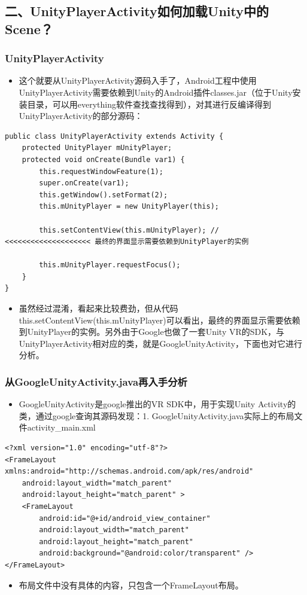 \documentclass[9pt, b5paper]{article}
\begin{document}
\subsection{二、UnityPlayerActivity如何加载Unity中的Scene？}
\label{sec-1-2}
\subsubsection{UnityPlayerActivity}
\label{sec-1-2-1}
\begin{itemize}
\item 这个就要从UnityPlayerActivity源码入手了，Android工程中使用UnityPlayerActivity需要依赖到Unity的Android插件classes.jar（位于Unity安装目录，可以用everything软件查找查找得到），对其进行反编译得到UnityPlayerActivity的部分源码：
\end{itemize}
\begin{verbatim}
public class UnityPlayerActivity extends Activity {
    protected UnityPlayer mUnityPlayer;
    protected void onCreate(Bundle var1) {
        this.requestWindowFeature(1);
        super.onCreate(var1);
        this.getWindow().setFormat(2);
        this.mUnityPlayer = new UnityPlayer(this);

        this.setContentView(this.mUnityPlayer); // <<<<<<<<<<<<<<<<<<<< 最终的界面显示需要依赖到UnityPlayer的实例

        this.mUnityPlayer.requestFocus();
    }
}
\end{verbatim}
\begin{itemize}
\item 虽然经过混淆，看起来比较费劲，但从代码this.setContentView(this.mUnityPlayer)可以看出，最终的界面显示需要依赖到UnityPlayer的实例。另外由于Google也做了一套Unity VR的SDK，与UnityPlayerActivity相对应的类，就是GoogleUnityActivity，下面也对它进行分析。
\end{itemize}
\subsubsection{从GoogleUnityActivity.java再入手分析}
\label{sec-1-2-2}
\begin{itemize}
\item GoogleUnityActivity是google推出的VR SDK中，用于实现Unity Activity的类，通过google查询其源码发现：1. GoogleUnityActivity.java实际上的布局文件activity\_main.xml
\end{itemize}
\begin{verbatim}
<?xml version="1.0" encoding="utf-8"?>
<FrameLayout xmlns:android="http://schemas.android.com/apk/res/android"
    android:layout_width="match_parent"
    android:layout_height="match_parent" >
    <FrameLayout
        android:id="@+id/android_view_container"
        android:layout_width="match_parent"
        android:layout_height="match_parent"
        android:background="@android:color/transparent" />
</FrameLayout>
\end{verbatim}
\begin{itemize}
\item 布局文件中没有具体的内容，只包含一个FrameLayout布局。
\end{itemize}
\end{document}
